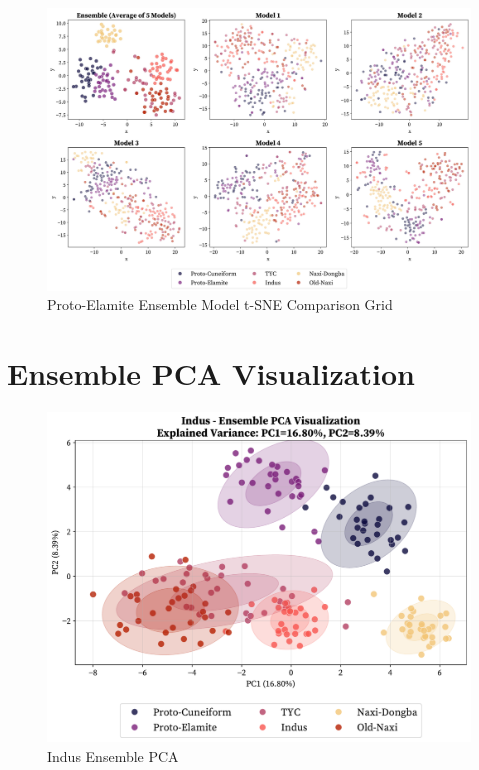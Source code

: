 \documentclass[11pt,a4paper,oneside]{report}
\begin{document}
\begin{figure}[H] 
    \centering
    \includegraphics[width=1\linewidth]{Visualizations/t-SNE/Proto-Elamite/model_comparison_grid.pdf}
    \caption*{Proto-Elamite Ensemble Model t-SNE Comparison Grid}
\end{figure}


\clearpage
\section{Ensemble PCA Visualization}
\label{app: pca}

\begin{figure}[H] 
    \centering
    \includegraphics[width=0.8\linewidth]{Visualizations/PCA/Indus/ensemble_pca.pdf}
     \caption*{Indus Ensemble PCA}
\end{figure}
\end{document}
